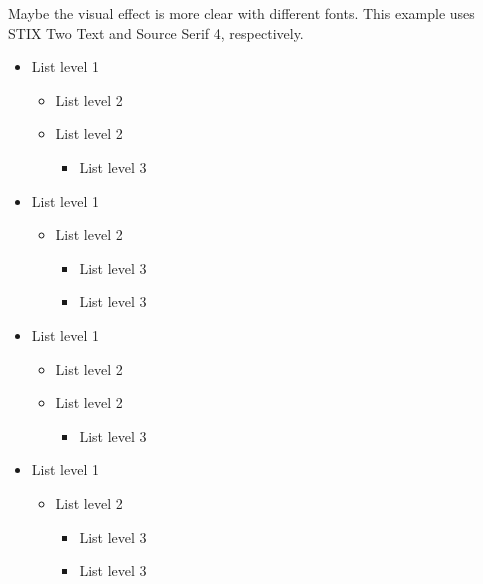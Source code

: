 \documentclass{beery}
\begin{document}
Maybe the visual effect is more clear with different fonts.
This example uses STIX Two Text and Source Serif 4, respectively.

\begingroup
  \newfontfamilystixtwo
  \begin{multicols}{2}
    \begin{itemize}
      \item List level 1
      \begin{itemize}
        \item List level 2
        \item List level 2
        \begin{itemize}
          \item List level 3
        \end{itemize}
      \end{itemize}
      \item List level 1
      \begin{itemize}
        \item List level 2
        \begin{itemize}
          \item List level 3
          \item List level 3
        \end{itemize}
      \end{itemize}
    \end{itemize}
  \end{multicols}
\endgroup

\begingroup
  \newfontfamilysourceseriffour
  \begin{multicols}{2}
    \begin{itemize}
      \item List level 1
      \begin{itemize}
        \item List level 2
        \item List level 2
        \begin{itemize}
          \item List level 3
        \end{itemize}
      \end{itemize}
      \item List level 1
      \begin{itemize}
        \item List level 2
        \begin{itemize}
          \item List level 3
          \item List level 3
        \end{itemize}
      \end{itemize}
    \end{itemize}
  \end{multicols}
\endgroup
\end{document}
